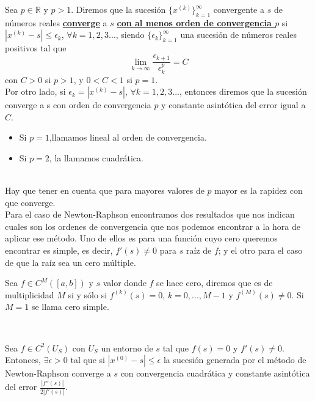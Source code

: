 \begin{definicion}
	Sea $p \in \mathbb{R}$ y $p > 1$. Diremos que la sucesión $\{ x^{(k)} \}^{\infty}_{k=1}$ convergente a $s$ de números reales \underline{\textbf{converge}} a $s$ \underline{\textbf{con al menos orden de convergencia $p$}} si $|x^{(k)} -s| \leq \epsilon_k$, $\forall k = 1,2,3...$, siendo $\{ \epsilon_k \}^{\infty}_{k=1}$ una sucesión de números reales positivos tal que
	\[
		\lim_{k \to \infty} \frac{\epsilon_{k+1}}{\epsilon^{p}_{k}} = C
	\]
	con $C > 0$ si $p > 1$, y $0 < C < 1$ si $p = 1$.
	${ }$\\
	
	Por otro lado, si $\epsilon_k = |x^{(k)} -s|$, $\forall k = 1,2,3...$, entonces diremos que la sucesión converge a s con orden de convergencia $p$ y constante asintótica del error igual a $C$.
	\begin{itemize}
		\item Si $p=1$,llamamos lineal al orden de convergencia.
		\item Si $p=2$, la llamamos cuadrática.
	\end{itemize}
\end{definicion}
${ }$\\

Hay que tener en cuenta que para mayores valores de $p$ mayor es la rapidez con que converge.
${ }$\\

Para el caso de Newton-Raphson encontramos dos resultados que nos indican cuales son los ordenes de convergencia que nos podemos encontrar a la hora de aplicar ese método. Uno de ellos es para una función cuyo cero queremos encontrar es simple, es decir, $f'(s) \neq 0$ para $s$ raíz de $f$; y el otro para el caso de que la raíz sea un cero múltiple.
${ }$\\

\begin{definicion}
	Sea $f \in C^M([a,b])$ y $s$ valor donde $f$ se hace cero, diremos que es de multiplicidad $M$ si y sólo si $f^{(k)}(s) = 0$, $k = 0, ..., M-1$ y $f^{(M)}(s) \neq 0$. Si $M = 1$ se llama cero simple.
\end{definicion}
${ }$\\

\begin{teorema}
	Sea $f \in C^2(U_S)$ con $U_S$ un entorno de $s$ tal que $f(s) = 0$ y $f'(s) \neq 0$. Entonces, $\exists \epsilon > 0$ tal que si $|x^{(0)} - s| \leq \epsilon$ la sucesión generada por el método de Newton-Raphson converge a $s$ con convergencia cuadrática y constante asintótica del error $\frac{|f''(s)|}{2|f'(s)|}$.
\end{teorema}

